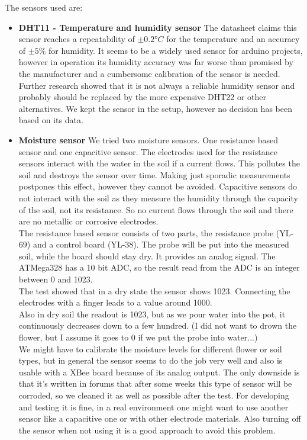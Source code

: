 The sensors used are:
\begin{itemize}

\item \textbf{DHT11 - Temperature and humidity sensor}
The datasheet claims this sensor reaches a repeatability of $\pm0.2°C$ for the temperature and an accuracy of $\pm 5\%$ for humidity. It seems to be a widely used sensor for arduino projects, however in operation its humidity accuracy was far worse than promised by the manufacturer and a cumbersome calibration of the sensor is needed. Further research showed that it is not always a reliable humidity sensor and probably should be replaced by the more expensive DHT22 or other alternatives. We kept the sensor in the setup, however no decision has been based on its data.

\item \textbf{Moisture sensor}
We tried two moisture sensors. One resistance based sensor and one capacitive sensor. The electrodes used for the resistance sensors interact with the water in the soil if a current flows. This pollutes the soil and destroys the sensor over time. Making just sporadic measurements postpones this effect, however they cannot be avoided. Capacitive sensors do not interact with the soil as they measure the humidity through the capacity of the soil, not its resistance. So no current flows through the soil and there are no metallic or corrosive electrodes.\\

The resistance based sensor consists of two parts, the resistance probe (YL-69) and a control board (YL-38). The probe will be put into the measured soil, while the board should stay dry. It provides an analog signal. The ATMega328 has a 10 bit ADC, so the result read from the ADC is an integer between 0 and 1023.\\

The test showed that in a dry state the sensor shows 1023. Connecting the electrodes with a finger leads to a value around 1000.\\
Also in dry soil the readout is 1023, but as we pour water into the pot, it continuously decreases down to a few hundred. (I did not want to drown the flower, but I assume it goes to 0 if we put the probe into water...)\\

We might have to calibrate the moisture levels for different flower or soil types, but in general the sensor seems to do the job very well and also is usable with a XBee board because of its analog output. The only downside is that it's written in forums that after some weeks this type of sensor will be corroded, so we cleaned it as well as possible after the test. For developing and testing it is fine, in a real environment one might want to use another sensor like a capacitive one or with other electrode materials. Also turning off the sensor when not using it is a good approach to avoid this problem.\\


\end{itemize}
